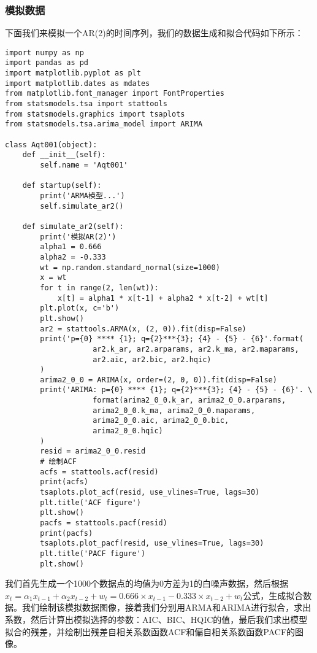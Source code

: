 \subsubsection{模拟数据}
下面我们来模拟一个AR(2)的时间序列，我们的数据生成和拟合代码如下所示：
\begin{lstlisting}
import numpy as np
import pandas as pd
import matplotlib.pyplot as plt
import matplotlib.dates as mdates
from matplotlib.font_manager import FontProperties
from statsmodels.tsa import stattools
from statsmodels.graphics import tsaplots
from statsmodels.tsa.arima_model import ARIMA

class Aqt001(object):
    def __init__(self):
        self.name = 'Aqt001'
        
    def startup(self):
        print('ARMA模型...')
        self.simulate_ar2()
        
    def simulate_ar2(self):
        print('模拟AR(2)')
        alpha1 = 0.666
        alpha2 = -0.333
        wt = np.random.standard_normal(size=1000)
        x = wt
        for t in range(2, len(wt)):
            x[t] = alpha1 * x[t-1] + alpha2 * x[t-2] + wt[t]
        plt.plot(x, c='b')
        plt.show()
        ar2 = stattools.ARMA(x, (2, 0)).fit(disp=False)
        print('p={0} **** {1}; q={2}***{3}; {4} - {5} - {6}'.format(
                    ar2.k_ar, ar2.arparams, ar2.k_ma, ar2.maparams, 
                    ar2.aic, ar2.bic, ar2.hqic)
        )
        arima2_0_0 = ARIMA(x, order=(2, 0, 0)).fit(disp=False)
        print('ARIMA: p={0} **** {1}; q={2}***{3}; {4} - {5} - {6}'. \
                    format(arima2_0_0.k_ar, arima2_0_0.arparams, 
                    arima2_0_0.k_ma, arima2_0_0.maparams, 
                    arima2_0_0.aic, arima2_0_0.bic, 
                    arima2_0_0.hqic)
        )
        resid = arima2_0_0.resid
        # 绘制ACF
        acfs = stattools.acf(resid)
        print(acfs)
        tsaplots.plot_acf(resid, use_vlines=True, lags=30)
        plt.title('ACF figure')
        plt.show()
        pacfs = stattools.pacf(resid)
        print(pacfs)
        tsaplots.plot_pacf(resid, use_vlines=True, lags=30)
        plt.title('PACF figure')
        plt.show()
\end{lstlisting}
我们首先生成一个1000个数据点的均值为0方差为1的白噪声数据，然后根据$x_{t}=\alpha _{1}x_{t-1} + \alpha _{2}x_{t-2} + w_{t}=0.666 \times x_{t-1} - 0.333 \times x_{t-2} + w_{t}$公式，生成拟合数据。我们绘制该模拟数据图像，接着我们分别用ARMA和ARIMA进行拟合，求出系数，然后计算出模拟选择的参数：AIC、BIC、HQIC的值，最后我们求出模型拟合的残差，并绘制出残差自相关系数函数ACF和偏自相关系数函数PACF的图像。
